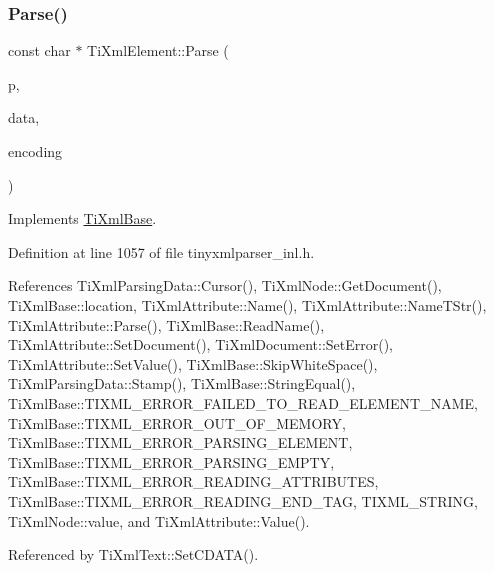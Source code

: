 \subsubsection{\texorpdfstring{Parse()}{Parse()}}
{\footnotesize\ttfamily const char $\ast$ Ti\+Xml\+Element\+::\+Parse (\begin{DoxyParamCaption}\item[{const char $\ast$}]{p,  }\item[{\hyperlink{class_ti_xml_parsing_data}{Ti\+Xml\+Parsing\+Data} $\ast$}]{data,  }\item[{\hyperlink{tinyxml_8h_a88d51847a13ee0f4b4d320d03d2c4d96}{Ti\+Xml\+Encoding}}]{encoding }\end{DoxyParamCaption})\hspace{0.3cm}{\ttfamily [virtual]}}



Implements \hyperlink{class_ti_xml_base_a00e4edb0219d00a1379c856e5a1d2025}{Ti\+Xml\+Base}.



Definition at line 1057 of file tinyxmlparser\+\_\+inl.\+h.



References Ti\+Xml\+Parsing\+Data\+::\+Cursor(), Ti\+Xml\+Node\+::\+Get\+Document(), Ti\+Xml\+Base\+::location, Ti\+Xml\+Attribute\+::\+Name(), Ti\+Xml\+Attribute\+::\+Name\+T\+Str(), Ti\+Xml\+Attribute\+::\+Parse(), Ti\+Xml\+Base\+::\+Read\+Name(), Ti\+Xml\+Attribute\+::\+Set\+Document(), Ti\+Xml\+Document\+::\+Set\+Error(), Ti\+Xml\+Attribute\+::\+Set\+Value(), Ti\+Xml\+Base\+::\+Skip\+White\+Space(), Ti\+Xml\+Parsing\+Data\+::\+Stamp(), Ti\+Xml\+Base\+::\+String\+Equal(), Ti\+Xml\+Base\+::\+T\+I\+X\+M\+L\+\_\+\+E\+R\+R\+O\+R\+\_\+\+F\+A\+I\+L\+E\+D\+\_\+\+T\+O\+\_\+\+R\+E\+A\+D\+\_\+\+E\+L\+E\+M\+E\+N\+T\+\_\+\+N\+A\+ME, Ti\+Xml\+Base\+::\+T\+I\+X\+M\+L\+\_\+\+E\+R\+R\+O\+R\+\_\+\+O\+U\+T\+\_\+\+O\+F\+\_\+\+M\+E\+M\+O\+RY, Ti\+Xml\+Base\+::\+T\+I\+X\+M\+L\+\_\+\+E\+R\+R\+O\+R\+\_\+\+P\+A\+R\+S\+I\+N\+G\+\_\+\+E\+L\+E\+M\+E\+NT, Ti\+Xml\+Base\+::\+T\+I\+X\+M\+L\+\_\+\+E\+R\+R\+O\+R\+\_\+\+P\+A\+R\+S\+I\+N\+G\+\_\+\+E\+M\+P\+TY, Ti\+Xml\+Base\+::\+T\+I\+X\+M\+L\+\_\+\+E\+R\+R\+O\+R\+\_\+\+R\+E\+A\+D\+I\+N\+G\+\_\+\+A\+T\+T\+R\+I\+B\+U\+T\+ES, Ti\+Xml\+Base\+::\+T\+I\+X\+M\+L\+\_\+\+E\+R\+R\+O\+R\+\_\+\+R\+E\+A\+D\+I\+N\+G\+\_\+\+E\+N\+D\+\_\+\+T\+AG, T\+I\+X\+M\+L\+\_\+\+S\+T\+R\+I\+NG, Ti\+Xml\+Node\+::value, and Ti\+Xml\+Attribute\+::\+Value().



Referenced by Ti\+Xml\+Text\+::\+Set\+C\+D\+A\+T\+A().


